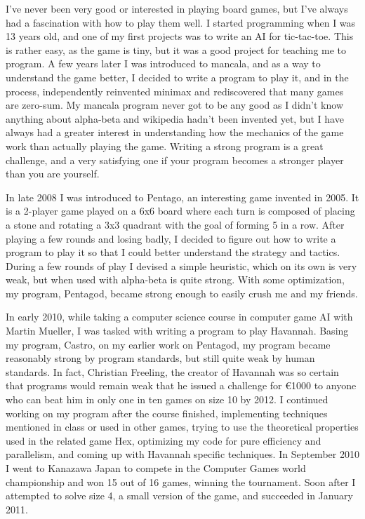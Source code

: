I've never been very good or interested in playing board games, but I've always had a fascination with how to play them well. I started programming when I was 13 years old, and one of my first projects was to write an AI for tic-tac-toe. This is rather easy, as the game is tiny, but it was a good project for teaching me to program. A few years later I was introduced to mancala, and as a way to understand the game better, I decided to write a program to play it, and in the process, independently reinvented minimax and rediscovered that many games are zero-sum. My mancala program never got to be any good as I didn't know anything about alpha-beta and wikipedia hadn't been invented yet, but I have always had a greater interest in understanding how the mechanics of the game work than actually playing the game. Writing a strong program is a great challenge, and a very satisfying one if your program becomes a stronger player than you are yourself.

In late 2008 I was introduced to Pentago, an interesting game invented in 2005. It is a 2-player game played on a 6x6 board where each turn is composed of placing a stone and rotating a 3x3 quadrant with the goal of forming 5 in a row. After playing a few rounds and losing badly, I decided to figure out how to write a program to play it so that I could better understand the strategy and tactics. During a few rounds of play I devised a simple heuristic, which on its own is very weak, but when used with alpha-beta is quite strong. With some optimization, my program, Pentagod, became strong enough to easily crush me and my friends.

In early 2010, while taking a computer science course in computer game AI with Martin Mueller, I was tasked with writing a program to play Havannah. Basing my program, Castro, on my earlier work on Pentagod, my program became reasonably strong by program standards, but still quite weak by human standards. In fact, Christian Freeling, the creator of Havannah was so certain that programs would remain weak that he issued a challenge for \euro 1000 to anyone who can beat him in only one in ten games on size 10 by 2012. I continued working on my program after the course finished, implementing techniques mentioned in class or used in other games, trying to use the theoretical properties used in the related game Hex, optimizing my code for pure efficiency and parallelism, and coming up with Havannah specific techniques. In September 2010 I went to Kanazawa Japan to compete in the Computer Games world championship and won 15 out of 16 games, winning the tournament. Soon after I attempted to solve size 4, a small version of the game, and succeeded in January 2011.

